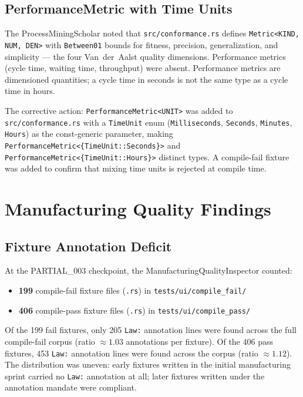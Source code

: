 \subsection{PerformanceMetric with Time Units}

The ProcessMiningScholar noted that \texttt{src/conformance.rs} defines
\texttt{Metric<KIND, NUM, DEN>} with \texttt{Between01} bounds for fitness,
precision, generalization, and simplicity --- the four Van~der~Aalst quality
dimensions. Performance metrics (cycle time, waiting time, throughput) were
absent. Performance metrics are dimensioned quantities; a cycle time in seconds
is not the same type as a cycle time in hours.

The corrective action: \texttt{PerformanceMetric<UNIT>} was added to
\texttt{src/conformance.rs} with a \texttt{TimeUnit} enum
(\texttt{Milliseconds}, \texttt{Seconds}, \texttt{Minutes}, \texttt{Hours})
as the const-generic parameter, making \texttt{PerformanceMetric<\{TimeUnit::Seconds\}>}
and \texttt{PerformanceMetric<\{TimeUnit::Hours\}>} distinct types. A
compile-fail fixture was added to confirm that mixing time units is rejected
at compile time.

\section{Manufacturing Quality Findings}
\label{sec:eval-mfq}

\subsection{Fixture Annotation Deficit}

At the PARTIAL\_003 checkpoint, the ManufacturingQualityInspector counted:

\begin{itemize}
  \item \textbf{199} compile-fail fixture files (\texttt{.rs}) in
    \texttt{tests/ui/compile\_fail/}
  \item \textbf{406} compile-pass fixture files (\texttt{.rs}) in
    \texttt{tests/ui/compile\_pass/}
\end{itemize}

Of the 199 fail fixtures, only 205 \texttt{Law:} annotation lines were found
across the full compile-fail corpus (ratio $\approx 1.03$ annotations per
fixture). Of the 406 pass fixtures, 453 \texttt{Law:} annotation lines were
found across the corpus (ratio $\approx 1.12$). The distribution was uneven:
early fixtures written in the initial manufacturing sprint carried no
\texttt{Law:} annotation at all; later fixtures written under the annotation
mandate were compliant.


